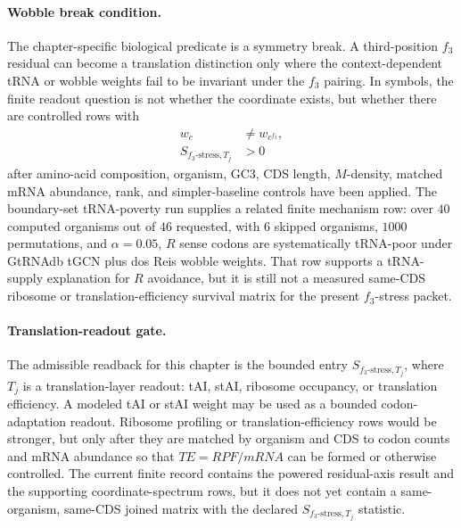 \paragraph{Wobble break condition.}
The chapter-specific biological predicate is a symmetry break. A third-position $f_3$ residual can become a translation distinction only where the context-dependent tRNA or wobble weights fail to be invariant under the $f_3$ pairing. In symbols, the finite readout question is not whether the coordinate exists, but whether there are controlled rows with
$$
\begin{aligned}
w_c &\neq w_{c^{f_3}},\\
S_{f_3\text{-stress},T_j} &> 0
\end{aligned}
$$
after amino-acid composition, organism, GC3, CDS length, $M$-density, matched mRNA abundance, rank, and simpler-baseline controls have been applied. The boundary-set tRNA-poverty run supplies a related finite mechanism row: over $40$ computed organisms out of $46$ requested, with $6$ skipped organisms, $1000$ permutations, and $\alpha=0.05$, $R$ sense codons are systematically tRNA-poor under GtRNAdb tGCN plus dos Reis wobble weights. That row supports a tRNA-supply explanation for $R$ avoidance, but it is still not a measured same-CDS ribosome or translation-efficiency survival matrix for the present $f_3$-stress packet.

\paragraph{Translation-readout gate.}
The admissible readback for this chapter is the bounded entry $S_{f_3\text{-stress},T_j}$, where $T_j$ is a translation-layer readout: tAI, stAI, ribosome occupancy, or translation efficiency. A modeled tAI or stAI weight may be used as a bounded codon-adaptation readout. Ribosome profiling or translation-efficiency rows would be stronger, but only after they are matched by organism and CDS to codon counts and mRNA abundance so that $TE=RPF/mRNA$ can be formed or otherwise controlled. The current finite record contains the powered residual-axis result and the supporting coordinate-spectrum rows, but it does not yet contain a same-organism, same-CDS joined matrix with the declared $S_{f_3\text{-stress},T_j}$ statistic.

